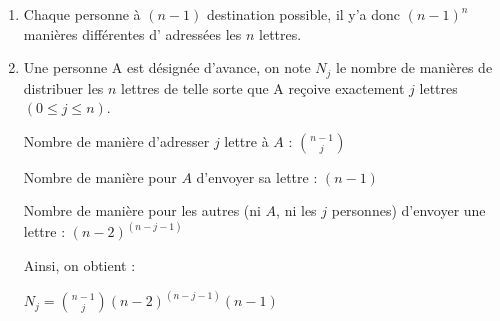 \documentclass[a4paper,10pt]{article}
\renewcommand{\leq}{\leqslant}
\begin{document}
	\begin{enumerate}
	\item
	Chaque personne à $(n-1)$ destination possible, il y'a donc $(n-1)^n$ manières différentes d' adressées les $n$ lettres.
	\item Une personne A est désignée d'avance, on note $N_j$ le nombre de manières de distribuer les $n$ lettres de telle sorte que A reçoive exactement $j $ lettres $(0\leq j \leq n)$. 
	
	Nombre de manière d'adresser $j$ lettre à $A$ : 
		$\binom{ n-1}{j}$
		
	Nombre de manière pour $A$ d'envoyer sa lettre : $(n-1)$
	
	Nombre de manière pour les autres (ni $A$, ni les $j$ personnes) d'envoyer une lettre : $(n-2)^{(n-j-1)}$
	
	Ainsi, on obtient :
	\begin{center}
		$N_j = \binom{ n-1}{j}(n-2)^{(n-j-1)}(n-1)$
	 \end{center}
	\end{enumerate}
	
\end{document}
